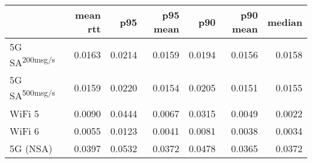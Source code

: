 \begin{tabular}{l|rrrrrr}
\rowcolor{gray!50}
 & mean rtt & p95 & p95 mean & p90 & p90 mean & median\\\hline
5G SA\textsuperscript{200msg/s} & 0.0163 & 0.0214 & 0.0159 & 0.0194 & 0.0156 & 0.0158 \\
5G SA\textsuperscript{500msg/s} & 0.0159 & 0.0220 & 0.0154 & 0.0205 & 0.0151 & 0.0155 \\
WiFi 5 & 0.0090 & 0.0444 & 0.0067 & 0.0315 & 0.0049 & 0.0022 \\
WiFi 6 & 0.0055 & 0.0123 & 0.0041 & 0.0081 & 0.0038 & 0.0034 \\
5G (NSA) & 0.0397 & 0.0532 & 0.0372 & 0.0478 & 0.0365 & 0.0372 \\
\end{tabular}
